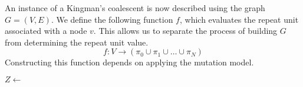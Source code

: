 An instance of a Kingman's coalescent is now described using the graph $G = (V, E)$.
We define the following function $f$, which evaluates the repeat unit associated with a node $v$.
This allows us to separate the process of building $G$ from determining the repeat unit value.
\begin{equation}
    f : V \rightarrow \left( \pi_0 \cup \pi_1 \cup \ldots \cup \pi_N \right)
\end{equation}
Constructing this function depends on applying the mutation model.

\begin{algorithm}[t]
    $Z \gets $


\end{algorithm}

